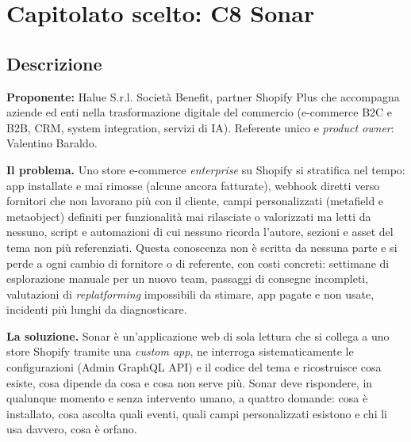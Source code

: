\section{Capitolato scelto: C8 Sonar}

\subsection{Descrizione}

\textbf{Proponente:} Halue S.r.l. Società Benefit, partner Shopify Plus che accompagna aziende ed enti nella trasformazione digitale del commercio (e-commerce B2C e B2B, CRM, system integration, servizi di IA). Referente unico e \emph{product owner}: Valentino Baraldo.

\textbf{Il problema.} Uno store e-commerce \emph{enterprise} su Shopify si stratifica nel tempo: app installate e mai rimosse (alcune ancora fatturate), webhook diretti verso fornitori che non lavorano più con il cliente, campi personalizzati (metafield e metaobject) definiti per funzionalità mai rilasciate o valorizzati ma letti da nessuno, script e automazioni di cui nessuno ricorda l'autore, sezioni e asset del tema non più referenziati. Questa conoscenza non è scritta da nessuna parte e si perde a ogni cambio di fornitore o di referente, con costi concreti: settimane di esplorazione manuale per un nuovo team, passaggi di consegne incompleti, valutazioni di \emph{replatforming} impossibili da stimare, app pagate e non usate, incidenti più lunghi da diagnosticare.

\textbf{La soluzione.} Sonar è un'applicazione web di sola lettura che si collega a uno store Shopify tramite una \emph{custom app}, ne interroga sistematicamente le configurazioni (Admin GraphQL API) e il codice del tema e ricostruisce cosa esiste, cosa dipende da cosa e cosa non serve più. Sonar deve rispondere, in qualunque momento e senza intervento umano, a quattro domande: cosa è installato, cosa ascolta quali eventi, quali campi personalizzati esistono e chi li usa davvero, cosa è orfano.


